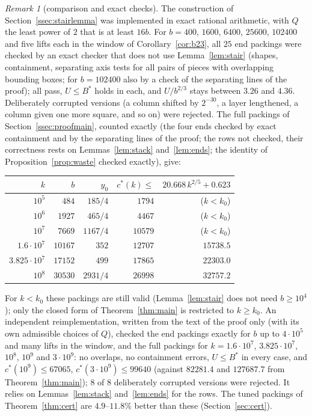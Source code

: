 \documentclass[11pt]{amsart}
\newcommand{\cs}{c^{*}}
\theoremstyle{definition}
\theoremstyle{remark}
\newtheorem{remark}[theorem]{Remark}
\numberwithin{equation}{section}
\begin{document}
\begin{remark}[comparison and exact checks]\label{rem:stairexact}
The construction of Section~\ref{ssec:stairlemma} was implemented in exact rational arithmetic, with $Q$ the least power
of $2$ that is at least $16b$. For $b=400$, $1600$, $6400$, $25600$, $102400$ and five lifts each in the window of
Corollary~\ref{cor:b23}, all $25$ end packings were checked by an exact checker that does not use
Lemma~\ref{lem:stair} (shapes, containment, separating axis tests for all pairs of pieces with overlapping bounding
boxes; for $b=102400$ also by a check of the separating lines of the proof); all pass, $U\le B^*$ holds in each, and
$U/b^{2/3}$ stays between $3.26$ and $4.36$. Deliberately corrupted versions (a column shifted by $2^{-30}$, a layer
lengthened, a column given one more square, and so on) were rejected. The full packings of
Section~\ref{ssec:proofmain}, counted exactly (the four ends checked by exact containment and by the separating lines
of the proof; the rows not checked, their correctness rests on Lemmas~\ref{lem:stack} and~\ref{lem:ends}; the identity
of Proposition~\ref{prop:waste} checked exactly), give:
\begin{center}
\small
\begin{tabular}{rrrrr}
\toprule
$k$ & $b$ & $y_0$ & $\cs(k)\le$ & $20.668\,k^{2/5}+0.623$\\
\midrule
$10^5$ & $484$ & $185/4$ & $1794$ & ($k<k_0$)\\
$10^6$ & $1927$ & $465/4$ & $4467$ & ($k<k_0$)\\
$10^7$ & $7669$ & $1167/4$ & $10579$ & ($k<k_0$)\\
$1.6\cdot10^7$ & $10167$ & $352$ & $12707$ & $15738.5$\\
$3.825\cdot10^7$ & $17152$ & $499$ & $17865$ & $22303.0$\\
$10^8$ & $30530$ & $2931/4$ & $26998$ & $32757.2$\\
\bottomrule
\end{tabular}
\end{center}
For $k<k_0$ these packings are still valid (Lemma~\ref{lem:stair} does not need $b\ge10^4$); only the closed form of
Theorem~\ref{thm:main} is restricted to $k\ge k_0$. An independent reimplementation, written from the text of the proof
only (with its own admissible choices of $Q$), checked the end packings exactly for $b$ up to $4\cdot10^5$ and many
lifts in the window, and the full packings for $k=1.6\cdot10^7$, $3.825\cdot10^7$, $10^8$, $10^9$ and $3\cdot10^9$: no
overlaps, no containment errors, $U\le B^*$ in every case, and $\cs(10^9)\le67065$, $\cs(3\cdot10^9)\le99640$ (against
$82281.4$ and $127687.7$ from Theorem~\ref{thm:main}); $8$ of $8$ deliberately corrupted versions were rejected. It
relies on Lemmas~\ref{lem:stack} and~\ref{lem:ends} for the rows. The tuned packings of Theorem~\ref{thm:cert} are
$4.9$--$11.8\%$ better than these (Section~\ref{sec:cert}).
\end{remark}
\end{document}
